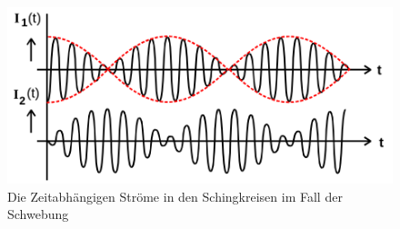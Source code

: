 \begin{figure}
    \centering
    \includegraphics[width = \textwidth]{./logos/Abb3.png}
    \caption{Die Zeitabhängigen Ströme in den Schingkreisen im Fall der Schwebung}
    \label{fig:Abb3}
\end{figure}
\FloatBarrier
